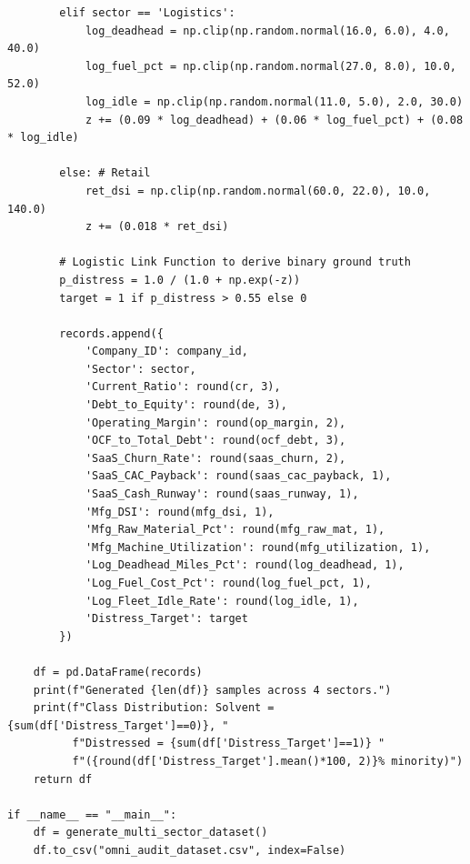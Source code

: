 \documentclass[11pt, a4paper]{article}
\begin{document}
\begin{verbatim}
        elif sector == 'Logistics':
            log_deadhead = np.clip(np.random.normal(16.0, 6.0), 4.0, 40.0)
            log_fuel_pct = np.clip(np.random.normal(27.0, 8.0), 10.0, 52.0)
            log_idle = np.clip(np.random.normal(11.0, 5.0), 2.0, 30.0)
            z += (0.09 * log_deadhead) + (0.06 * log_fuel_pct) + (0.08 * log_idle)
            
        else: # Retail
            ret_dsi = np.clip(np.random.normal(60.0, 22.0), 10.0, 140.0)
            z += (0.018 * ret_dsi)
        
        # Logistic Link Function to derive binary ground truth
        p_distress = 1.0 / (1.0 + np.exp(-z))
        target = 1 if p_distress > 0.55 else 0
        
        records.append({
            'Company_ID': company_id,
            'Sector': sector,
            'Current_Ratio': round(cr, 3),
            'Debt_to_Equity': round(de, 3),
            'Operating_Margin': round(op_margin, 2),
            'OCF_to_Total_Debt': round(ocf_debt, 3),
            'SaaS_Churn_Rate': round(saas_churn, 2),
            'SaaS_CAC_Payback': round(saas_cac_payback, 1),
            'SaaS_Cash_Runway': round(saas_runway, 1),
            'Mfg_DSI': round(mfg_dsi, 1),
            'Mfg_Raw_Material_Pct': round(mfg_raw_mat, 1),
            'Mfg_Machine_Utilization': round(mfg_utilization, 1),
            'Log_Deadhead_Miles_Pct': round(log_deadhead, 1),
            'Log_Fuel_Cost_Pct': round(log_fuel_pct, 1),
            'Log_Fleet_Idle_Rate': round(log_idle, 1),
            'Distress_Target': target
        })
        
    df = pd.DataFrame(records)
    print(f"Generated {len(df)} samples across 4 sectors.")
    print(f"Class Distribution: Solvent = {sum(df['Distress_Target']==0)}, "
          f"Distressed = {sum(df['Distress_Target']==1)} "
          f"({round(df['Distress_Target'].mean()*100, 2)}% minority)")
    return df

if __name__ == "__main__":
    df = generate_multi_sector_dataset()
    df.to_csv("omni_audit_dataset.csv", index=False)
\end{verbatim}
\end{document}
